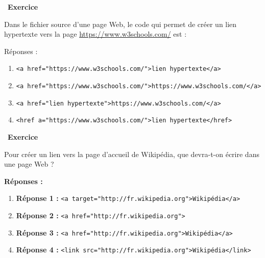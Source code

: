 \documentclass[
  11pt,
]{article}
\newcommand{\passthrough}[1]{#1}
\newcounter{exo}
\newenvironment{exercice}[1]
{\par \medskip   \addtocounter{exo}{1} \noindent  
\begin{bclogo}[arrondi =0.1,   noborder = true, logo=\bccrayon, marge=4]{~\textbf{Exercice} \textbf{\theexo} {\itshape #1} }  \par}
{
\end{bclogo}
 \par \bigskip }
\newcounter{def}
\begin{document}
\begin{exercice}{}

Dans le fichier source d'une page Web, le code qui permet de créer un
lien hypertexte vers la page \url{https://www.w3schools.com/} est :

Réponses :

\begin{enumerate}
\def\labelenumi{\arabic{enumi}.}
\item
  \passthrough{\lstinline!<a href="https://www.w3schools.com/">lien hypertexte</a>!}
\item
  \passthrough{\lstinline!<a href="https://www.w3schools.com/">https://www.w3schools.com/</a>!}
\item
  \passthrough{\lstinline!<a href="lien hypertexte">https://www.w3schools.com/</a>!}
\item
  \passthrough{\lstinline!<href a="https://www.w3schools.com/">lien hypertexte</href>!}
\end{enumerate}

\end{exercice}

\begin{exercice}{}

Pour créer un lien vers la page d'accueil de Wikipédia, que devra-t-on
écrire dans une page Web ?

\textbf{Réponses :}

\begin{enumerate}
\def\labelenumi{\arabic{enumi}.}
\item
  \textbf{Réponse 1 :}
  \passthrough{\lstinline!<a target="http://fr.wikipedia.org">Wikipédia</a>!}
\item
  \textbf{Réponse 2 :}
  \passthrough{\lstinline!<a href="http://fr.wikipedia.org">!}
\item
  \textbf{Réponse 3 :}
  \passthrough{\lstinline!<a href="http://fr.wikipedia.org">Wikipédia</a>!}
\item
  \textbf{Réponse 4 :}
  \passthrough{\lstinline!<link src="http://fr.wikipedia.org">Wikipédia</link>!}
\end{enumerate}

\end{exercice}
\end{document}

